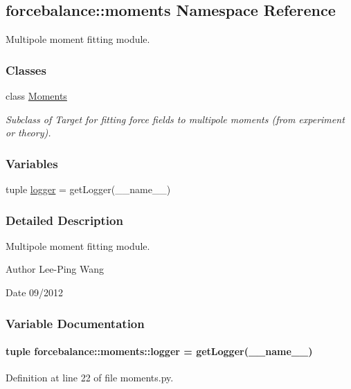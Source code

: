 \hypertarget{namespaceforcebalance_1_1moments}{\subsection{forcebalance\-:\-:moments \-Namespace \-Reference}
\label{namespaceforcebalance_1_1moments}
}


\-Multipole moment fitting module.  


\subsubsection*{\-Classes}
\begin{DoxyCompactItemize}
\item 
class \hyperlink{classforcebalance_1_1moments_1_1Moments}{\-Moments}
\begin{DoxyCompactList}\small\item\em \-Subclass of \-Target for fitting force fields to multipole moments (from experiment or theory). \end{DoxyCompactList}\end{DoxyCompactItemize}
\subsubsection*{\-Variables}
\begin{DoxyCompactItemize}
\item 
tuple \hyperlink{namespaceforcebalance_1_1moments_a92133a6e6d1078c3f8986326bd63e184}{logger} = get\-Logger(\-\_\-\-\_\-name\-\_\-\-\_\-)
\end{DoxyCompactItemize}


\subsubsection{\-Detailed \-Description}
\-Multipole moment fitting module. \begin{DoxyAuthor}{\-Author}
\-Lee-\/\-Ping \-Wang 
\end{DoxyAuthor}
\begin{DoxyDate}{\-Date}
09/2012 
\end{DoxyDate}


\subsubsection{\-Variable \-Documentation}
\hypertarget{namespaceforcebalance_1_1moments_a92133a6e6d1078c3f8986326bd63e184}{
\paragraph[{logger}]{\setlength{\rightskip}{0pt plus 5cm}tuple {\bf forcebalance\-::moments\-::logger} = get\-Logger(\-\_\-\-\_\-name\-\_\-\-\_\-)}}\label{namespaceforcebalance_1_1moments_a92133a6e6d1078c3f8986326bd63e184}


\-Definition at line 22 of file moments.\-py.

